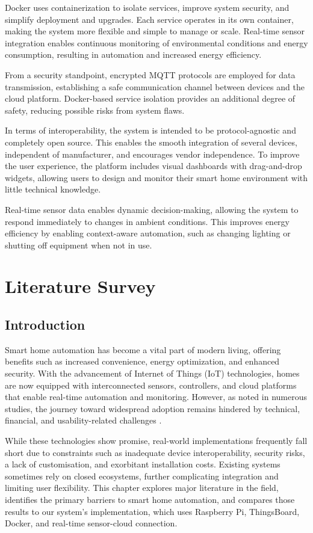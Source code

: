 \documentclass[a4paper,12pt]{report}
\begin{document}
Docker uses containerization to isolate services, improve system security, and simplify deployment and upgrades.  Each service operates in its own container, making the system more flexible and simple to manage or scale.  Real-time sensor integration enables continuous monitoring of environmental conditions and energy consumption, resulting in automation and increased energy efficiency.

From a security standpoint, encrypted MQTT protocols are employed for data transmission, establishing a safe communication channel between devices and the cloud platform.  Docker-based service isolation provides an additional degree of safety, reducing possible risks from system flaws.

In terms of interoperability, the system is intended to be protocol-agnostic and completely open source.  This enables the smooth integration of several devices, independent of manufacturer, and encourages vendor independence.  To improve the user experience, the platform includes visual dashboards with drag-and-drop widgets, allowing users to design and monitor their smart home environment with little technical knowledge.

Real-time sensor data enables dynamic decision-making, allowing the system to respond immediately to changes in ambient conditions.  This improves energy efficiency by enabling context-aware automation, such as changing lighting or shutting off equipment when not in use.


\chapter{Literature Survey}

\section{Introduction}
Smart home automation has become a vital part of modern living, offering benefits such as increased convenience, energy optimization, and enhanced security. With the advancement of Internet of Things (IoT) technologies, homes are now equipped with interconnected sensors, controllers, and cloud platforms that enable real-time automation and monitoring. However, as noted in numerous studies, the journey toward widespread adoption remains hindered by technical, financial, and usability-related challenges \cite{julies}\cite{Zhang2022TheCS}\cite{Ahmed02102021}.

While these technologies show promise, real-world implementations frequently fall short due to constraints such as inadequate device interoperability, security risks, a lack of customisation, and exorbitant installation costs.  Existing systems sometimes rely on closed ecosystems, further complicating integration and limiting user flexibility.  This chapter explores major literature in the field, identifies the primary barriers to smart home automation, and compares those results to our system's implementation, which uses Raspberry Pi, ThingsBoard, Docker, and real-time sensor-cloud connection.
\end{document}
